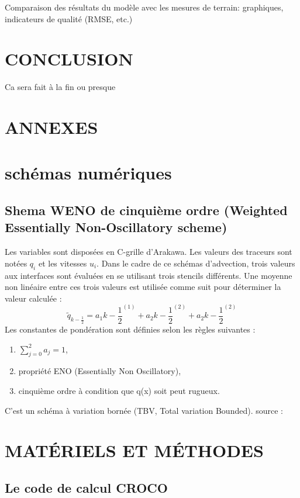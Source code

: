 \documentclass[10pt,a4paper,titlepage]{article}
\begin{document}
Comparaison des résultats du modèle avec les mesures de terrain: graphiques, indicateurs de qualité (RMSE, etc.)

\newpage

\section{CONCLUSION}
\label{sec:conclusion}

Ca sera fait à la fin ou presque


\newpage
\section*{ANNEXES}

\section{schémas numériques}
\subsection{Shema WENO de cinquième ordre (Weighted Essentially Non-Oscillatory scheme)}\label{WENO}
Les variables sont disposées en C-grille d'Arakawa.
Les valeurs des traceurs sont notées $q_i$ et les vitesses $u_i$.
Dans le cadre de ce schémas d'advection, trois valeurs aux interfaces sont évaluées en se utilisant trois stencils différents. Une moyenne non linéaire entre ces trois valeurs est utilisée comme suit pour déterminer la valeur calculée :
$$\tilde{q}_{k-\frac{1}{2}} = a_1k-\frac{1}{2}^{(1)} + a_2k-\frac{1}{2}^{(2)} + a_2k-\frac{1}{2}^{(2)}$$
Les constantes de pondération sont définies selon les règles suivantes :
\begin{enumerate}
    \item $\sum_{j=0}^{2}a_j = 1$,
    \item propriété ENO (Essentially Non Oscillatory),
    \item cinquième ordre à condition que q(x) soit peut rugueux.
\end{enumerate}
C'est un schéma à variation bornée (TBV, Total variation Bounded).
source : \cite{schemas_advection}


\section{MATÉRIELS ET MÉTHODES}

\subsection{Le code de calcul CROCO}
\end{document}
